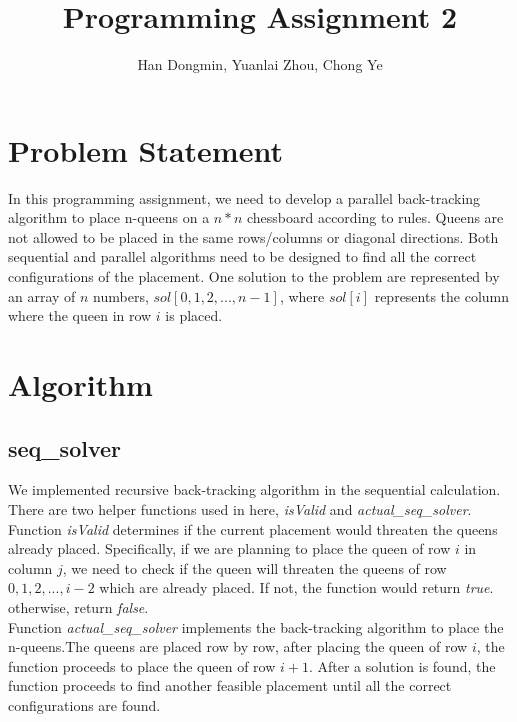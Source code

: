 \documentclass[twoside,12pt]{article}
\title{Programming Assignment 2}
\author{Han Dongmin, Yuanlai Zhou, Chong Ye}
\begin{document}
\maketitle
\section{Problem Statement}
In this programming assignment, we need to develop a parallel back-tracking algorithm to place n-queens on a $ n * n $ chessboard according to rules. Queens are not allowed to be placed in the same rows/columns or diagonal directions. Both sequential and parallel algorithms need to be designed to find all the correct configurations of the placement. One solution to the problem are represented by an array of $ n $ numbers, $ sol[0,1,2,...,n-1] $, where $ sol[i] $ represents the column where the queen in row $ i $ is placed.
\section{Algorithm}


\subsection{seq\_solver}
We implemented recursive back-tracking algorithm in the sequential calculation. There are two helper functions used in here, \textit{isValid} and \textit{actual\_seq\_solver}.\\
Function \textit{isValid} determines if the current placement would threaten the queens already placed. Specifically, if we are planning to place the queen of row $ i $ in column $ j $, we need to check if the queen will threaten the queens of row $ 0,1,2,...,i-2 $ which are already placed. If not, the function would return \textit{true}. otherwise, return \textit{false}. \\
Function \textit{actual\_seq\_solver} implements the back-tracking algorithm to place the n-queens.The queens are placed row by row, after placing the queen of row $ i $, the function proceeds to place the queen of row $ i+1 $. After a solution is found, the function proceeds to find another feasible placement until all the correct configurations are found. 
\end{document}
